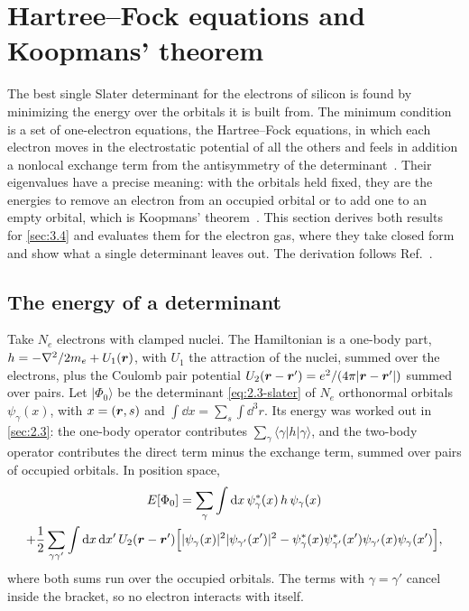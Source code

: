 \section{Hartree--Fock equations and Koopmans' theorem}\label{app:D.4}

The best single Slater determinant for the electrons of silicon is found by minimizing the energy over the orbitals it is built from. The minimum condition is a set of one-electron equations, the Hartree--Fock equations, in which each electron moves in the electrostatic potential of all the others and feels in addition a nonlocal exchange term from the antisymmetry of the determinant~\cite{fock1930naherungsmethode}. Their eigenvalues have a precise meaning: with the orbitals held fixed, they are the energies to remove an electron from an occupied orbital or to add one to an empty orbital, which is Koopmans' theorem~\cite{koopmans1934zuordnung}. This section derives both results for \cref{sec:3.4} and evaluates them for the electron gas, where they take closed form and show what a single determinant leaves out. The derivation follows Ref.~\cite[Chap.~2]{giuliani2005quantum}.

\subsection*{The energy of a determinant}

Take $N_e$ electrons with clamped nuclei. The Hamiltonian is a one-body part, $h = -\nabla^2/2m_e + U_1(\bm{r})$, with $U_1$ the attraction of the nuclei, summed over the electrons, plus the Coulomb pair potential $U_2(\bm{r} - \bm{r}') = e^2/(4\pi|\bm{r} - \bm{r}'|)$ summed over pairs. Let $|\Phi_0\rangle$ be the determinant \cref{eq:2.3-slater} of $N_e$ orthonormal orbitals $\psi_\gamma(x)$, with $x = (\bm{r}, s)$ and $\int\dd x = \sum_s\int\dd^3r$. Its energy was worked out in \cref{sec:2.3}: the one-body operator contributes $\sum_\gamma\langle\gamma|h|\gamma\rangle$, and the two-body operator contributes the direct term minus the exchange term, summed over pairs of occupied orbitals. In position space,
\begin{multline}
  E[\Phi_0] = \sum_\gamma\int\mathrm{d} x\,\psi^*_\gamma(x)\,h\,\psi_\gamma(x) \\
  + \frac12\sum_{\gamma\gamma'}\int\mathrm{d} x\,\mathrm{d} x'\,U_2(\bm{r} - \bm{r}')\Bigl[|\psi_\gamma(x)|^2|\psi_{\gamma'}(x')|^2 - \psi^*_\gamma(x)\psi^*_{\gamma'}(x')\psi_{\gamma'}(x)\psi_\gamma(x')\Bigr] ,
  \label{eq:D.4-energy}
\end{multline}
where both sums run over the occupied orbitals. The terms with $\gamma = \gamma'$ cancel inside the bracket, so no electron interacts with itself.

